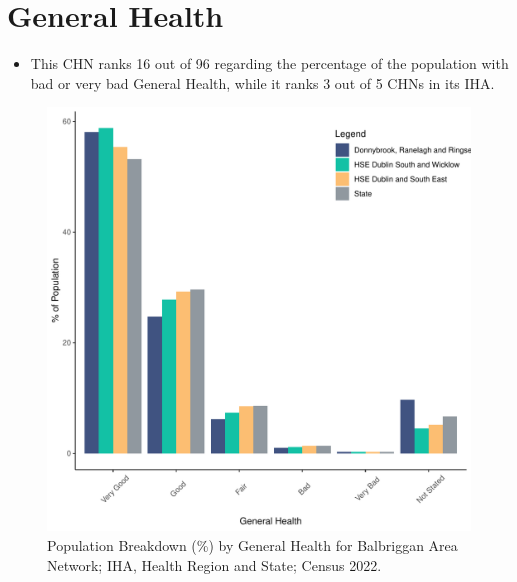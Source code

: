 \documentclass{article}
\begin{document}
\pagebreak

\section{General Health}\label{sect:GenHealth}
\begin{itemize}
\item  This CHN ranks  16 out of 96 regarding the percentage of the population with bad or very bad General Health, while it ranks   3 out of 5 CHNs in its IHA.
\end{itemize}
\begin{figure}[h]
	\centering
	\includegraphics[width = 150mm]{../figures/GenED.pdf}
	\caption{Population Breakdown (\%) by General Health for Balbriggan Area Network; IHA, Health Region and State;  Census 2022.}
	\label{fig:2ae19629-1a6a-13a3-e055-000000000001}
	\end{figure}
\end{document}

